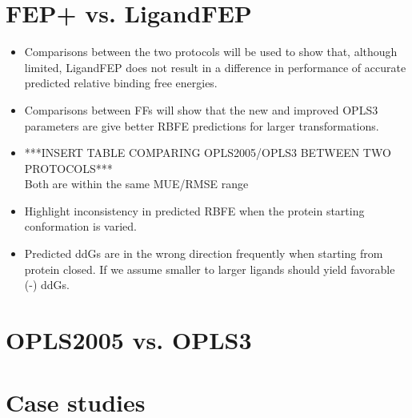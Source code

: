 \documentclass[journal=jctcce,manuscript=article]{achemso}
\begin{document}
\begin{suppinfo}
\section{FEP+ vs. LigandFEP}
   \begin{itemize}
   \item Comparisons between the two protocols will be used to show that, although limited, LigandFEP does not result in a difference in performance of accurate predicted relative binding free energies.
   \item Comparisons between FFs will show that the new and improved OPLS3 parameters are give better RBFE predictions for larger transformations.
   \item ***INSERT TABLE COMPARING OPLS2005/OPLS3 BETWEEN TWO PROTOCOLS***
      \\ Both are within the same MUE/RMSE range
   \item Highlight inconsistency in predicted RBFE when the protein starting conformation is varied.
   \item Predicted ddGs are in the wrong direction frequently when starting from protein closed.
      If we assume smaller to larger ligands should yield favorable (-) ddGs.
   \end{itemize}

\section{OPLS2005 vs. OPLS3}

\section{Case studies}

\end{suppinfo}
\end{document}
